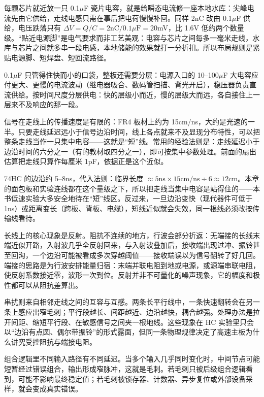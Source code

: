 每颗芯片就近放一只 0.1$\mu$F 瓷片电容，就是给瞬态电流修一座本地水库：尖峰电流先由它供给，走线电感只需在事后把电荷慢慢补回。同样 2nC 改由 0.1$\mu$F 供给，电压跌落只有 $\Delta V=Q/C=2\mathrm{nC}/0.1\mu\mathrm{F}=20$mV，比 1.6V 低约两个数量级。“贴近电源脚”是电气要求而非工艺美观：电容与芯片之间每多一毫米走线，水库与芯片之间就多串一段电感，本地储能的效果就打一分折扣。所以布局规则是紧贴电源脚、短焊盘、短回流路径。

0.1$\mu$F 只管得住快而小的口袋，整板还需要分层：电源入口的 10–100$\mu$F 大电容应付更大、更慢的电流波动（继电器吸合、数码管扫描、背光开启），稳压器负责直流供给。按时间尺度分层供电：快的层级小而近，慢的层级大而远，各自接住上一层来不及响应的那一段。

信号在走线上的传播速度是有限的：FR4 板材上约为 15cm/ns，大约是光速的一半。只要走线延迟远小于信号边沿时间，线上各点就来不及显现分布特性，可以把整条走线当作一只集中电容——这就是“短”线。常用的经验法则是：走线延迟小于边沿时间的六分之一（有的教材取四分之一），即可按集中参数处理。前面的扇出估算把走线只算作每厘米 1pF，依据正是这个近似。

74HC 的边沿约 5–8ns，代入法则：临界长度 $\approx5\mathrm{ns}\times15\mathrm{cm/ns}\div6\approx12$cm。本章的面包板和实验连线都在这个量级之下，所以把走线当集中电容是站得住的——本书低速实验大多安全地待在“短”线区。反过来，一旦边沿变快（现代器件可低于 1ns）或距离变长（跨板、背板、电缆），短线近似就会失效，同一根线必须改按传输线看待。

长线上的核心现象是反射。阻抗不连续的地方，行波会部分折返：无端接的长线末端近似开路，入射波几乎全反射回来，与入射波叠加后，接收端出现过冲、振铃甚至回沟，一个边沿可能被看成多次穿越阈值——接收端误以为信号翻转了好几回。端接的思路是为行波安排能量归宿：末端并联电阻到地或电源，或源端串联电阻，使反射系数接近零，波形一次到位。反射并非不可量化的噪声现象，它的幅度和极性都可以从阻抗差算出。

串扰则来自相邻走线之间的互容与互感。两条长平行线中，一条快速翻转会在另一条上感应出窄毛刺；平行段越长、间距越近、边沿越快，耦合越强。处理办法是拉开间距、缩短平行段、在敏感信号之间夹一根地线。这些现象在 HC 实验里只会以“边沿有点圆、偶尔带振铃”的形式露面，但同一条物理规律决定了高速主板为什么讲究受控阻抗与端接电阻。

组合逻辑里不同输入路径有不同延迟。当多个输入几乎同时变化时，中间节点可能短暂经过错误组合，输出形成窄脉冲，这就是毛刺。若毛刺只被后级组合逻辑看到，可能不影响最终稳定值；若毛刺被锁存器、计数器、异步复位或外部设备采样，就会变成真实错误。

